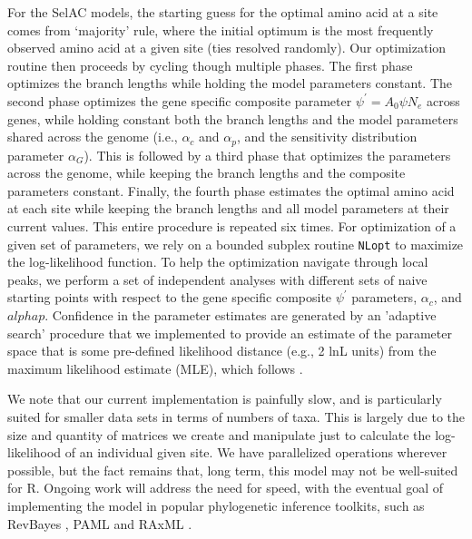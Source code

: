 \documentclass{article}
\newcommand{\Ne}{\ensuremath{{N_e}}\xspace} %
\newcommand{\selac}{SelAC\xspace}
\newcommand{\alphac}{\ensuremath{\alpha_c}\xspace}
\newcommand{\alphag}{\ensuremath{\alpha_G}\xspace}
\newcommand{\alphap}{\ensuremath{\alpha_p}\xspace}
\newcommand{\psiprime}{\ensuremath{\psi^\prime}\xspace}
\begin{document}
For the \selac models, the starting guess for the optimal amino acid at a site comes from `majority' rule, where the initial optimum is the most frequently observed amino acid at a given site (ties resolved randomly).
Our optimization routine then proceeds by cycling though multiple phases.
The first phase optimizes the branch lengths while holding the model parameters constant.
The second phase optimizes the gene specific composite parameter $ \psiprime = A_0 \psi \Ne$ across genes, while holding constant both the branch lengths and the model parameters shared across the genome (i.e., $\alphac$ and $\alphap$, and the sensitivity distribution parameter $\alphag$).
This is followed by a third phase that optimizes the parameters across the genome, while keeping the branch lengths and the composite parameters constant.
Finally, the fourth phase estimates the optimal amino acid at each site while keeping the branch lengths and all model parameters at their current values.
This entire procedure is repeated six times.
For optimization of a given set of parameters, we rely on a bounded subplex routine \texttt{NLopt} \citet{Johnson2012} to maximize the log-likelihood function.
To help the optimization navigate through local peaks, we perform a set of independent analyses with different sets of naive starting points with respect to the gene specific composite $\psiprime$ parameters, $\alphac$, and $alphap$.
Confidence in the parameter estimates are generated by an 'adaptive search' procedure that we implemented to provide an estimate of the parameter space that is some pre-defined likelihood distance (e.g., 2 lnL units) from the maximum likelihood estimate (MLE), which follows  \citet{BeaulieuAndOMeara2016,edwards1984likelihood}.

We note that our current implementation is painfully slow, and is particularly suited for smaller data sets in terms of numbers of taxa.
This is largely due to the size and quantity of matrices we create and manipulate just to calculate the log-likelihood of an individual given site.
We have parallelized operations wherever possible, but the fact remains that, long term, this model may not be well-suited for R.
Ongoing work will address the need for speed, with the eventual goal of implementing the model in popular phylogenetic inference toolkits, such as RevBayes \citep{revbayes}, PAML \citep{Yang2007} and RAxML \citep{Stamatakis2006}.
\end{document}
